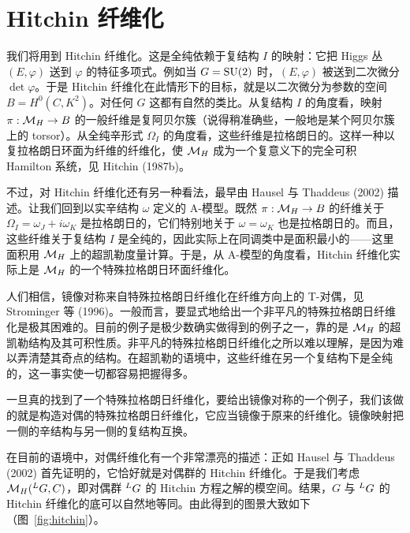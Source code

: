 \section{Hitchin 纤维化}

我们将用到 Hitchin 纤维化。这是全纯依赖于复结构 $I$ 的映射：它把 Higgs 丛 $(E,\varphi)$ 送到 $\varphi$ 的特征多项式。例如当 $G=\operatorname{SU}(2)$ 时，$(E,\varphi)$ 被送到二次微分 $\det\varphi$。于是 Hitchin 纤维化在此情形下的目标，就是以二次微分为参数的空间 $B=H^{0}(C,K^{2})$。对任何 $G$ 这都有自然的类比。从复结构 $I$ 的角度看，映射 $\pi:\mathcal{M}_{H}\to B$ 的一般纤维是复阿贝尔簇（说得稍准确些，一般地是某个阿贝尔簇上的 torsor）。从全纯辛形式 $\Omega_{I}$ 的角度看，这些纤维是拉格朗日的。这样一种以复拉格朗日环面为纤维的纤维化，使 $\mathcal{M}_{H}$ 成为一个复意义下的完全可积 Hamilton 系统，见 Hitchin (1987b)。

不过，对 Hitchin 纤维化还有另一种看法，最早由 Hausel 与 Thaddeus (2002) 描述。让我们回到以实辛结构 $\omega$ 定义的 A-模型。既然 $\pi:\mathcal{M}_{H}\to B$ 的纤维关于 $\Omega_{I}=\omega_{J}+i\omega_{K}$ 是拉格朗日的，它们特别地关于 $\omega=\omega_{K}$ 也是拉格朗日的。而且，这些纤维关于复结构 $I$ 是全纯的，因此实际上在同调类中是面积最小的——这里面积用 $\mathcal{M}_{H}$ 上的超凯勒度量计算。于是，从 A-模型的角度看，Hitchin 纤维化实际上是 $\mathcal{M}_{H}$ 的一个特殊拉格朗日环面纤维化。

人们相信，镜像对称来自特殊拉格朗日纤维化在纤维方向上的 T-对偶，见 Strominger 等 (1996)。一般而言，要显式地给出一个非平凡的特殊拉格朗日纤维化是极其困难的。目前的例子是极少数确实做得到的例子之一，靠的是 $\mathcal{M}_{H}$ 的超凯勒结构及其可积性质。非平凡的特殊拉格朗日纤维化之所以难以理解，是因为难以弄清楚其奇点的结构。在超凯勒的语境中，这些纤维在另一个复结构下是全纯的，这一事实使一切都容易把握得多。

一旦真的找到了一个特殊拉格朗日纤维化，要给出镜像对称的一个例子，我们该做的就是构造对偶的特殊拉格朗日纤维化，它应当镜像于原来的纤维化。镜像映射把一侧的辛结构与另一侧的复结构互换。

在目前的语境中，对偶纤维化有一个非常漂亮的描述：正如 Hausel 与 Thaddeus (2002) 首先证明的，它恰好就是对偶群的 Hitchin 纤维化。于是我们考虑 $\mathcal{M}_{H}({}^{L}G,C)$，即对偶群 ${}^{L}G$ 的 Hitchin 方程之解的模空间。结果，$G$ 与 ${}^{L}G$ 的 Hitchin 纤维化的底可以自然地等同。由此得到的图景大致如下（图~\ref{fig:hitchin}）。


